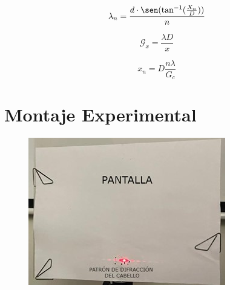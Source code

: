 \documentclass[twocolumn, 12pt]{article}
\begin{document}
{\Large
      \begin{equation}
            \lambda_{n} = \frac{d \cdot \sen ( \tan^{-1} (\frac{X_{n}}{D}))}{n}
            \label{eq:lambda-n}
      \end{equation}
}

{\Large
      \begin{equation}
            \mathcal{G}_x = \frac{\lambda D}{x}
            \label{eq:grosor-cabello}
      \end{equation}
}

{\Large
      \begin{equation}
            x_{n} = D \frac{n \lambda}{G_{c}}
            \label{eq:x_n}
      \end{equation}
}

\section{Montaje Experimental}

\begin{figure}[H]
      \begin{center}
            \includegraphics[width=.9\linewidth]{./Images/1.jpg}
            \caption{}
      \end{center}
\end{figure}

\vspace{-.5cm}
\end{document}
